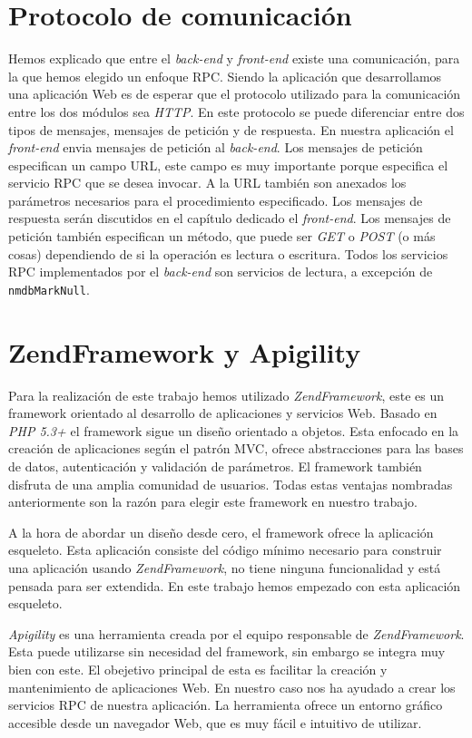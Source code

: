 \section{Protocolo de comunicación}
	Hemos explicado que entre el \emph{back-end} y \emph{front-end} existe una comunicación, para la que hemos elegido un enfoque RPC. Siendo la
	aplicación que desarrollamos una aplicación Web es de esperar que el protocolo utilizado para la comunicación entre los dos módulos sea
	\emph{HTTP}. En este protocolo se puede diferenciar entre dos tipos de mensajes, mensajes de petición y de respuesta. En nuestra aplicación el
	\emph{front-end} envia mensajes de petición al \emph{back-end}. Los mensajes de petición especifican un campo URL, este campo es muy
	importante porque especifica el servicio RPC que se desea invocar. A la URL también son anexados los parámetros necesarios para el
	procedimiento especificado. Los mensajes de respuesta serán discutidos en el capítulo dedicado el \emph{front-end}. Los mensajes de petición
	también especifican un método, que puede ser \emph{GET} o \emph{POST} (o más cosas) dependiendo de si la operación es lectura o escritura.
	Todos los servicios RPC implementados por el \emph{back-end} son servicios de lectura, a excepción de \texttt{nmdbMarkNull}.
\section{ZendFramework y Apigility}
	Para la realización de este trabajo hemos utilizado \emph{ZendFramework}, este es un framework orientado al desarrollo de aplicaciones y servicios
	Web. Basado en \emph{PHP 5.3+} el framework sigue un diseño orientado a objetos. Esta enfocado en la creación de aplicaciones según el patrón MVC,
	ofrece abstracciones para las bases de datos, autenticación y validación de parámetros. El framework también disfruta de una amplia comunidad
	de usuarios. Todas estas ventajas nombradas anteriormente son la razón para elegir este framework en nuestro trabajo.
	\par
	A la hora de abordar un diseño desde cero, el framework ofrece la aplicación esqueleto. Esta aplicación consiste del código mínimo necesario
	para construir una aplicación usando \emph{ZendFramework}, no tiene ninguna funcionalidad y está pensada para ser extendida. En este trabajo hemos
	empezado con esta aplicación esqueleto.
  	\par
	\emph{Apigility} es una herramienta creada por el equipo responsable de \emph{ZendFramework}. Esta puede utilizarse sin necesidad del framework, sin embargo
	se integra muy bien con este. El obejetivo principal de esta es facilitar la creación y mantenimiento de aplicaciones Web. En nuestro caso nos
	ha ayudado a crear los servicios RPC de nuestra aplicación. La herramienta ofrece un entorno gráfico accesible desde un navegador Web, que es
	muy fácil e intuitivo de utilizar.
